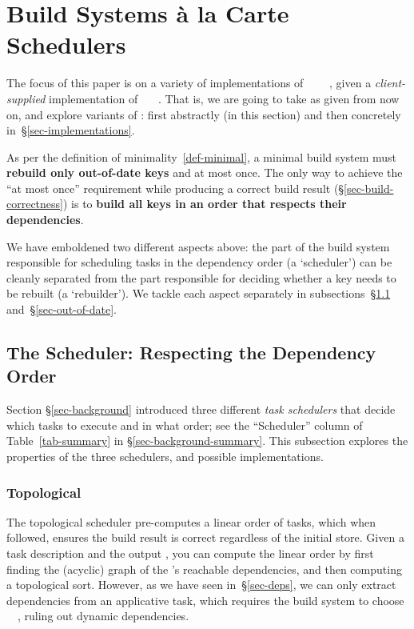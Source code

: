 \section{Build Systems \`a la Carte Schedulers}\label{sec-build}


The focus of this paper is on a variety of implementations of
~~~~, given
a \emph{client-supplied} implementation of ~~~. That
is, we are going to take  as given from now on, and explore variants of
: first abstractly (in this section) and then concretely
in~\S\ref{sec-implementations}.

As per the definition of minimality~\ref{def-minimal}, a minimal build
system must \textbf{rebuild only out-of-date keys} and at most once. The only
way to achieve the ``at most once'' requirement while producing a correct build
result (\S\ref{sec-build-correctness}) is to \textbf{build all keys in an
order that respects their dependencies}.

\vspace{1mm}
We have emboldened two different aspects above: the part of the
build system responsible for scheduling tasks in the dependency order
(a `scheduler') can be cleanly separated from the part responsible for deciding
whether a key needs to be rebuilt (a `rebuilder'). We tackle each
aspect separately in subsections~\S\ref{sec-dependency-orderings}
and~\S\ref{sec-out-of-date}.

\subsection{The Scheduler: Respecting the Dependency Order}
\label{sec-dependency-orderings}

Section \S\ref{sec-background} introduced three different \emph{task schedulers}
that decide which tasks to execute and in what order; see the ``Scheduler'' column
of Table~\ref{tab-summary} in \S\ref{sec-background-summary}.
This subsection explores the properties of the three schedulers, and
possible implementations.

\vspace{-2mm}
\subsubsection{Topological}\label{sec-topological}

The topological scheduler pre-computes a linear order of tasks, which when followed,
ensures the build result is correct regardless of the initial store. Given a
task description and the output , you can compute the linear order by
first finding the (acyclic) graph of the 's reachable dependencies, and
then computing a topological sort. However, as we have seen in~\S\ref{sec-deps},
we can only extract dependencies from an applicative task, which requires the
build system to choose ~\hs{=}~, ruling out dynamic
dependencies.

